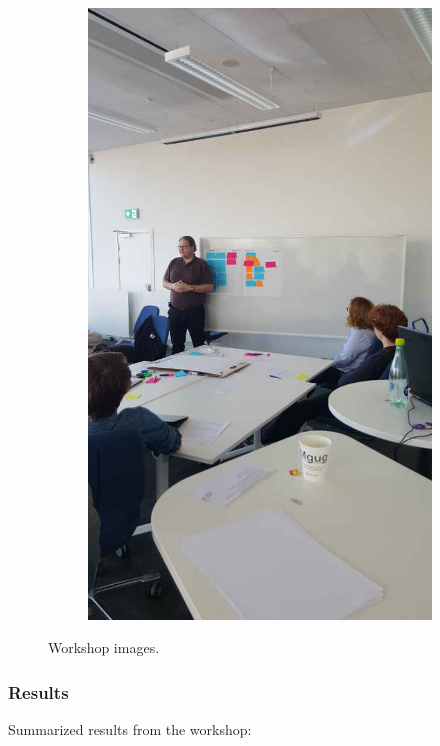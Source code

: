 \begin{figure}[hb]
\begin{subfigure}{.32\textwidth}
        \includegraphics[width=\textwidth, angle=270, origin=c]{img/workshop3_resized.jpg}
        \label{fig:workshop3}
    \end{subfigure}
    \caption{Workshop images.}
\end{figure}

\subsubsection{Results}
Summarized results from the workshop:

